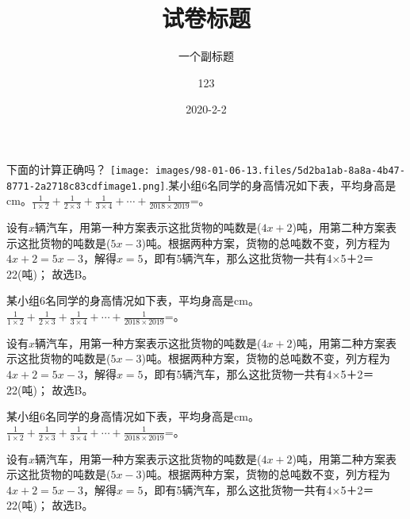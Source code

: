 \documentclass{BHCexam}
\begin{document}
\title{试卷标题}
\subtitle{一个副标题}
\author{123}
\date{2020-2-2}
\maketitle
\begin{groups}
\begin{questions}[p]
\question[] 下面的计算正确吗？ \quad\texttt{[image: images/98-01-06-13.files/5d2ba1ab-8a8a-4b47-8771-2a2718c83cdfimage1.png]}.某小组6名同学的身高情况如下表，平均身高是cm。\( \displaystyle \frac{1}{1\times 2}+\frac{1}{2\times 3}+\frac{1}{3\times 4}+\cdots +\frac{1}{2018\times 2019}\)=。 
\begin{solution}{4cm} 
\methodonly 设有\( x\)辆汽车，用第一种方案表示这批货物的吨数是(\( 4x+2\))吨，用第二种方案表示这批货物的吨数是(\( 5x-3\))吨。根据两种方案，货物的总吨数不变，列方程为\( 4x+2=5x-3\)，解得\( x=5\)，即有5辆汽车，那么这批货物一共有4×5＋2＝22(吨)； 故选B。 
\end{solution} 
\question[] 某小组6名同学的身高情况如下表，平均身高是cm。\( \displaystyle \frac{1}{1\times 2}+\frac{1}{2\times 3}+\frac{1}{3\times 4}+\cdots +\frac{1}{2018\times 2019}\)=。 
\begin{solution}{4cm} 
\methodonly 设有\( x\)辆汽车，用第一种方案表示这批货物的吨数是(\( 4x+2\))吨，用第二种方案表示这批货物的吨数是(\( 5x-3\))吨。根据两种方案，货物的总吨数不变，列方程为\( 4x+2=5x-3\)，解得\( x=5\)，即有5辆汽车，那么这批货物一共有4×5＋2＝22(吨)； 故选B。 
\end{solution} 
\question[] 某小组6名同学的身高情况如下表，平均身高是cm。\( \displaystyle \frac{1}{1\times 2}+\frac{1}{2\times 3}+\frac{1}{3\times 4}+\cdots +\frac{1}{2018\times 2019}\)=。 
\begin{solution}{4cm} 
\methodonly 设有\( x\)辆汽车，用第一种方案表示这批货物的吨数是(\( 4x+2\))吨，用第二种方案表示这批货物的吨数是(\( 5x-3\))吨。根据两种方案，货物的总吨数不变，列方程为\( 4x+2=5x-3\)，解得\( x=5\)，即有5辆汽车，那么这批货物一共有4×5＋2＝22(吨)； 故选B。 
\end{solution} 
 
\end{questions}


\end{groups}
\end{document}
